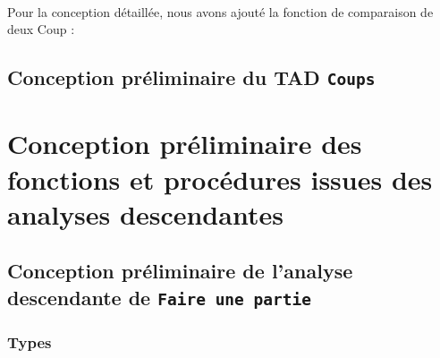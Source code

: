 ~\\
Pour la conception détaillée, nous avons ajouté la fonction de comparaison de deux \og Coup \fg{}  :
\begin{itemize}
\end{itemize}


\section{Conception préliminaire du TAD \tt{Coups}}
\begin{itemize}
\end{itemize}



\chapter{Conception préliminaire des fonctions et procédures issues des analyses descendantes}
\setcounter{section}{0}
\section{Conception préliminaire de l'analyse descendante de \tt{Faire une partie}}
\subsection{Types}
\begin{itemize}
\end{itemize}

